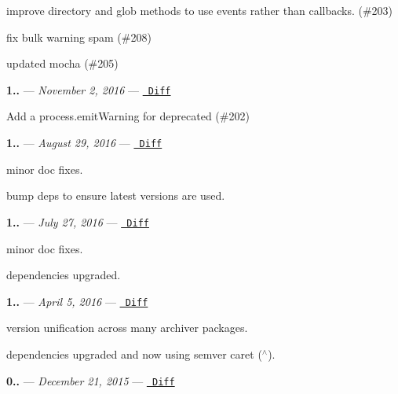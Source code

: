 \begin{DoxyItemize}
\item improve {\ttfamily directory} and {\ttfamily glob} methods to use events rather than callbacks. (\#203)
\item fix bulk warning spam (\#208)
\item updated mocha (\#205)
\end{DoxyItemize}

{\bfseries{1..}} — 
\footnotesize {\itshape November 2, 2016}
\normalsize  — \href{https://github.com/archiverjs/node-archiver/compare/1.1.0...1.2.0}{\texttt{ Diff}}


\begin{DoxyItemize}
\item Add a {\ttfamily process.\+emit\+Warning} for {\ttfamily deprecated} (\#202)
\end{DoxyItemize}

{\bfseries{1..}} — 
\footnotesize {\itshape August 29, 2016}
\normalsize  — \href{https://github.com/archiverjs/node-archiver/compare/1.0.1...1.1.0}{\texttt{ Diff}}


\begin{DoxyItemize}
\item minor doc fixes.
\item bump deps to ensure latest versions are used.
\end{DoxyItemize}

{\bfseries{1..}} — 
\footnotesize {\itshape July 27, 2016}
\normalsize  — \href{https://github.com/archiverjs/node-archiver/compare/1.0.0...1.0.1}{\texttt{ Diff}}


\begin{DoxyItemize}
\item minor doc fixes.
\item dependencies upgraded.
\end{DoxyItemize}

{\bfseries{1..}} — 
\footnotesize {\itshape April 5, 2016}
\normalsize  — \href{https://github.com/archiverjs/node-archiver/compare/0.21.0...1.0.0}{\texttt{ Diff}}


\begin{DoxyItemize}
\item version unification across many archiver packages.
\item dependencies upgraded and now using semver caret (\texorpdfstring{$^\wedge$}{\string^}).
\end{DoxyItemize}

{\bfseries{0..}} — 
\footnotesize {\itshape December 21, 2015}
\normalsize  — \href{https://github.com/archiverjs/node-archiver/compare/0.20.0...0.21.0}{\texttt{ Diff}}



